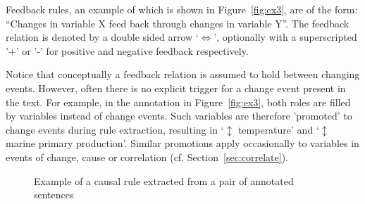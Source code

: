 \documentclass[10pt, a4paper]{article}
\begin{document}
Feedback rules, an example of which is shown in Figure~\ref{fig:ex3}, are of the form: ``Changes in variable X feed back through changes in variable Y''.
The feedback relation is denoted by a double sided arrow `$\Longleftrightarrow$', optionally with a superscripted '+' or '-' for positive and negative feedback respectively.

Notice that conceptually a feedback relation is assumed to hold between changing events.
However, often there is no explicit trigger for a change event present in the text.
For example, in the annotation in Figure~\ref{fig:ex3}, both roles are filled by variables instead of change events.
Such variables are therefore 'promoted' to change events during rule extraction, resulting in `$\updownarrow$ temperature' and `$\updownarrow$ marine primary production'.
Similar promotions apply occasionally to variables in events of change, cause or correlation (cf. Section~\ref{sec:correlate}).


\setlength{\fboxsep}{10pt}

\begin{figure}
\begin{center}
 \caption{Example of a causal rule extracted from a pair of annotated sentences}
\label{fig:ex1}
\end{center}
\end{figure}
\end{document}
